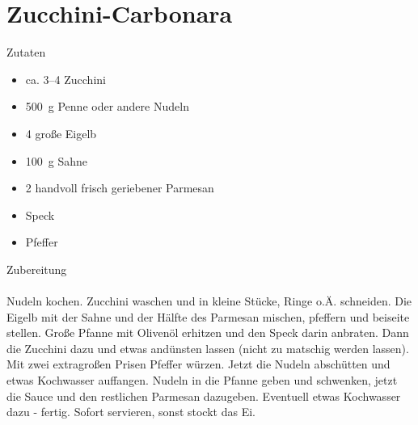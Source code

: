 \section*{Zucchini-Carbonara}
\ihead{}\ohead{}
\cfoot{}
{\Large Zutaten}
\begin{multicols}{2}
\begin{itemize}
    \item ca. \numrange{3}{4} Zucchini
    \item \SI{500}{g} Penne oder andere Nudeln
    \item \num{4} große Eigelb
    \item \SI{100}{g} Sahne
    \item \num{2} handvoll frisch geriebener Parmesan
    \item Speck
    \item Pfeffer
\end{itemize}
\columnbreak
\end{multicols}
\noindent
{\Large Zubereitung}\\
\\
Nudeln kochen.
Zucchini waschen und in kleine Stücke, Ringe o.Ä. schneiden.
Die Eigelb mit der Sahne und der Hälfte des Parmesan mischen, pfeffern und beiseite stellen.
Große Pfanne mit Olivenöl erhitzen und den Speck darin anbraten.
Dann die Zucchini dazu und etwas andünsten lassen (nicht zu matschig werden lassen).
Mit zwei extragroßen Prisen Pfeffer würzen.
Jetzt die Nudeln abschütten und etwas Kochwasser auffangen. 
Nudeln in die Pfanne geben und schwenken, jetzt die Sauce und den restlichen Parmesan dazugeben. 
Eventuell etwas Kochwasser dazu - fertig.
Sofort servieren, sonst stockt das Ei.